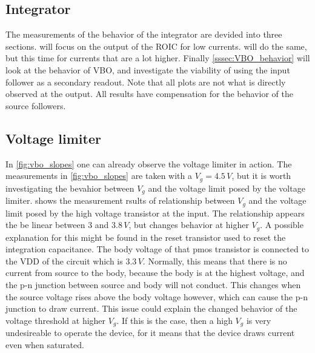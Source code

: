\subsection{Integrator}\label{ssec:dynamic_integrator}
The measurements of the behavior of the integrator are devided into three sections.  will focus on the output of the ROIC for low currents.  will do the same, but this time for currents that are a lot higher. Finally \cref{sssec:VBO_behavior} will look at the behavior of VBO, and investigate the viability of using the input follower as a secondary readout. Note that all plots are not what is directly observed at the output. All results have compensation for the behavior of the source followers.







\clearpage
\subsection{Voltage limiter}\label{ssec:dynamic_voltage_limiter}
In \cref{fig:vbo_slopes} one can already observe the voltage limiter in action. The measurements in \cref{fig:vbo_slopes} are taken with a $V_g=4.5\,V$, but it is worth investigating the bevahior between $V_g$ and the voltage limit posed by the voltage limiter.  shows the measurement rsults of relationship between $V_g$ and the voltage limit posed by the high voltage transistor at the input. The relationship appears the be linear between 3 and $3.8\,V$, but changes behavior at higher $V_g$. A possible explanation for this might be found in the reset transistor used to reset the integration capacitance. The body voltage of that pmos transistor is connected to the VDD of the circuit which is $3.3\,V$. Normally, this means that there is no current from source to the body, because the body is at the highest voltage, and the p-n junction between source and body will not conduct. This changes when the source voltage rises above the body voltage however, which can cause the p-n junction to draw current. This issue could explain the changed behavior of the voltage threshold at higher $V_g$. If this is the case, then a high $V_g$ is very undesireable to operate the device, for it means that the device draws current even when saturated. 

